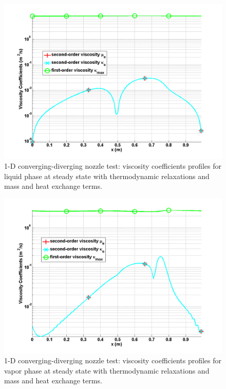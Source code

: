 %
\begin{figure}[H]
\centering
\includegraphics[width=\textwidth]{figures/SEM/Aint1e3MassOn_liquid_viscosity_kappa_mu.png}
\caption{1-D converging-diverging nozzle test: viscosity coefficients profiles for liquid phase at steady state with thermodynamic relaxations and mass and heat exchange terms.}
\label{fig:two-fluids-rel-nozzle-visc-liq-mass-on-sem-sect4}
\end{figure}
%
\begin{figure}[H]
\centering
\includegraphics[width=\textwidth]{figures/SEM/Aint1e3MassOn_vapor_viscosity_kappa_mu.png}
\caption{1-D converging-diverging nozzle test: viscosity coefficients profiles for vapor phase at steady state with thermodynamic relaxations and mass and heat exchange terms.}
\label{fig:two-fluids-rel-nozzle-visc-vap-mass-on-sem-sect4}
\end{figure}
